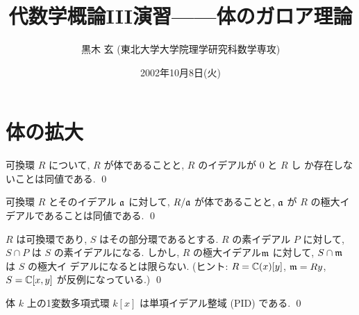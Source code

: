 \documentclass[12pt,twoside]{jarticle}
\begin{document}

\title{\bf 代数学概論III演習——体のガロア理論}

\author{黒木 玄 \quad (東北大学大学院理学研究科数学専攻)}

\date{2002年10月8日(火)}

\maketitle

\setcounter{page}{23}      %
\setcounter{section}{2}    %
\setcounter{theorem}{0}    %
\setcounter{question}{56}  %
\setcounter{footnote}{18}  %


\tableofcontents


\section{体の拡大}

\begin{question}[体のイデアルによる特徴付け]
  可換環 $R$ について, $R$ が体であることと, $R$ のイデアルが $0$ と $R$ し
  か存在しないことは同値である. \qed
\end{question}

\begin{question}[極大イデアルと体]
  可換環 $R$ とそのイデアル ${\mathfrak a}$ に対して, $R/{\mathfrak a}$ が体であることと,
  ${\mathfrak a}$ が $R$ の極大イデアルであることは同値である. \qed
\end{question}

\begin{question}
  $R$ は可換環であり, $S$ はその部分環であるとする.  
  $R$ の素イデアル $P$ に対して, $S\cap P$ は $S$ の素イデアルになる.
  しかし, $R$ の極大イデアル${\mathfrak m}$ に対して, $S\cap{\mathfrak m}$ は $S$ の極大イ
  デアルになるとは限らない. 
  (ヒント: $R={\mathbb C}(x)[y]$, ${\mathfrak m}=Ry$, $S={\mathbb C}[x,y]$ が反例になっている.) \qed
\end{question}

\begin{question}
  体 $k$ 上の1変数多項式環 $k[x]$ は単項イデアル整域 (PID) である. \qed
\end{question}
\end{document}
